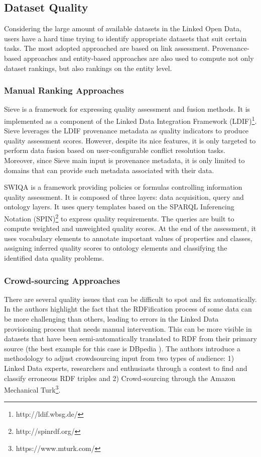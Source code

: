 \documentclass[onecolumn, crcready]{iosart2c}
\begin{document}
\subsection{Dataset Quality}
Considering the large amount of available datasets in the Linked Open Data, users have a hard time trying to identify appropriate datasets that suit certain tasks. The most adopted approached are based on link assessment. Provenance-based approaches and entity-based approaches are also used to compute not only dataset rankings, but also rankings on the entity level.\\

\subsubsection{Manual Ranking Approaches}

Sieve \cite{Mendes2012} is a framework for expressing quality assessment and fusion methods. It is implemented as a component of the Linked Data Integration Framework (LDIF)\footnote{http://ldif.wbsg.de/}. Sieve leverages the LDIF provenance metadata as quality indicators to produce quality assessment scores. However, despite its nice features, it is only targeted to perform data fusion based on user-configurable conflict resolution tasks. Moreover, since Sieve main input is provenance metadata, it is only limited to domains that can provide such metadata associated with their data.

SWIQA \cite{Furber2011a} is a framework providing policies or formulas controlling information quality assessment. It is composed of three layers: data acquisition, query and ontology layers. It uses query templates based on the SPARQL Inferencing Notation (SPIN)\footnote{http://spinrdf.org/} to express quality requirements. The queries are built to compute weighted and unweighted quality scores. At the end of the assessment, it uses vocabulary elements to annotate important values of properties and classes, assigning inferred quality scores to ontology elements and classifying the identified data quality problems.

\subsubsection{Crowd-sourcing Approaches}

There are several quality issues that can be difficult to spot and fix automatically. In \cite{Acosta2013} the authors highlight the fact that the RDFification process of some data can be more challenging than others, leading to errors in the Linked Data provisioning process that needs manual intervention. This can be more visible in datasets that have been semi-automatically translated to RDF from their primary source (the best example for this case is DBpedia \cite{bizer_dbpedia_2009}). The authors introduce a methodology to adjust crowdsourcing input from two types of audience: 1) Linked Data experts, researchers and enthusiasts through a contest to find and classify erroneous RDF triples and 2) Crowd-sourcing through the Amazon Mechanical Turk\footnote{https://www.mturk.com/}.
\end{document}
